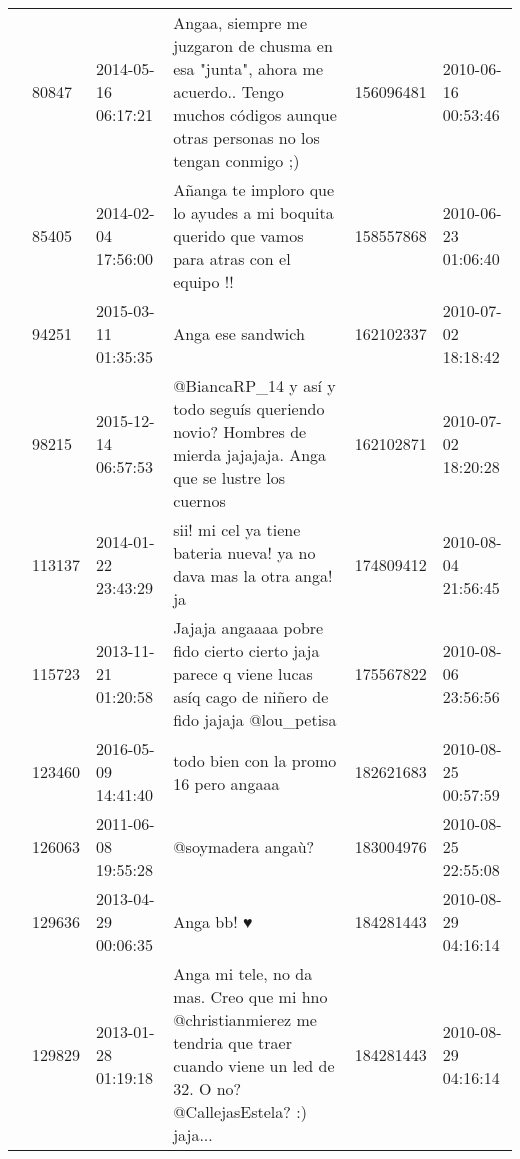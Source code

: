 \begin{tabular}{llllrl}
           & 80847   & 2014-05-16 06:17:21 &  Angaa, siempre me juzgaron de chusma en esa "junta", ahora me acuerdo.. Tengo muchos códigos aunque otras personas no los tengan conmigo ;) &   156096481 & 2010-06-16 00:53:46 \\
           & 85405   & 2014-02-04 17:56:00 &                                                   Añanga te imploro que lo ayudes a mi boquita querido que vamos para atras con el equipo !! &   158557868 & 2010-06-23 01:06:40 \\
           & 94251   & 2015-03-11 01:35:35 &                                                                                                                            Anga ese sandwich &   162102337 & 2010-07-02 18:18:42 \\
           & 98215   & 2015-12-14 06:57:53 &                                 @BiancaRP\_14 y así y todo seguís queriendo novio? Hombres de mierda jajajaja. Anga que se lustre los cuernos &   162102871 & 2010-07-02 18:20:28 \\
           & 113137  & 2014-01-22 23:43:29 &                                                                          sii! mi cel ya tiene bateria nueva! ya no dava mas la otra anga! ja &   174809412 & 2010-08-04 21:56:45 \\
           & 115723  & 2013-11-21 01:20:58 &                             Jajaja angaaaa pobre fido cierto cierto jaja parece q viene lucas asíq cago de niñero de fido jajaja @lou\_petisa &   175567822 & 2010-08-06 23:56:56 \\
           & 123460  & 2016-05-09 14:41:40 &                                                                                                        todo bien con la promo 16 pero angaaa &   182621683 & 2010-08-25 00:57:59 \\
           & 126063  & 2011-06-08 19:55:28 &                                                                                                                            @soymadera angaù? &   183004976 & 2010-08-25 22:55:08 \\
           & 129636  & 2013-04-29 00:06:35 &                                                                                                                                   Anga bb! ♥ &   184281443 & 2010-08-29 04:16:14 \\
           & 129829  & 2013-01-28 01:19:18 &  Anga mi tele, no da mas. Creo que mi hno @christianmierez me tendria que traer cuando viene un led de 32. O no? @CallejasEstela? :) jaja... &   184281443 & 2010-08-29 04:16:14 \\

\end{tabular}
